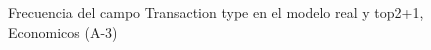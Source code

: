 \begin{figure}[H]
    \centering
    
    \caption{Frecuencia del campo Transaction type en el modelo real y top2+1, Economicos (A-3)}
    \label{frecuency-Transaction Type-top2+1}
\end{figure}